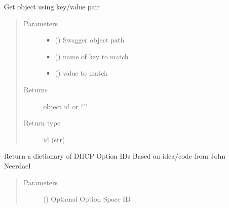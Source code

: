 \documentclass[letterpaper,10pt,english]{sphinxmanual}
\begin{document}
\begin{fulllineitems}
\begin{fulllineitems}
\label{\detokenize{b1ddi-class:bloxone.b1ddi.get_object_by_key}}
\sphinxAtStartPar
Get object using key/value pair
\begin{quote}\begin{description}
\item[{Parameters}] \leavevmode\begin{itemize}
\item {} 
\sphinxAtStartPar
{} () \textendash{} Swagger object path

\item {} 
\sphinxAtStartPar
{} () \textendash{} name of key to match

\item {} 
\sphinxAtStartPar
{} () \textendash{} value to match

\end{itemize}

\item[{Returns}] \leavevmode
\sphinxAtStartPar
object id or “”

\item[{Return type}] \leavevmode
\sphinxAtStartPar
id (str)

\end{description}\end{quote}

\end{fulllineitems}


\begin{fulllineitems}
\label{\detokenize{b1ddi-class:bloxone.b1ddi.get_option_ids}}
\sphinxAtStartPar
Return a dictionary of DHCP Option IDs
Based on idea/code from John Neerdael
\begin{quote}\begin{description}
\item[{Parameters}] \leavevmode
\sphinxAtStartPar
{} () \textendash{} Optional Option Space ID


\end{description}
\end{quote}
\end{fulllineitems}
\end{fulllineitems}
\end{document}
